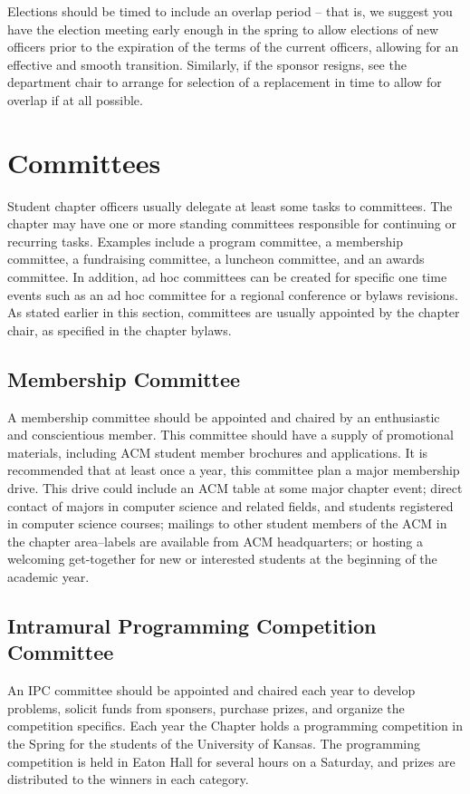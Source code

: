 Elections should be timed to include an overlap period -- that is, we suggest you have the election meeting early enough in the spring to allow elections of new officers prior to the expiration of the terms of the current officers, allowing for an effective and smooth transition. Similarly, if the sponsor resigns, see the department chair to arrange for selection of a replacement in time to allow for overlap if at all possible.

\section{Committees}

Student chapter officers usually delegate at least some tasks to committees. The chapter may have one or more standing committees responsible for continuing or recurring tasks. Examples include a program committee, a membership committee, a fundraising committee, a luncheon committee, and an awards committee. In addition, ad hoc committees can be created for specific one time events such as an ad hoc committee for a regional conference or bylaws revisions. As stated earlier in this section, committees are usually appointed by the chapter chair, as specified in the chapter bylaws.

\subsection*{Membership Committee}
A membership committee should be appointed and chaired by an enthusiastic and conscientious member. This committee should have a supply of promotional materials, including ACM student member brochures and applications. It is recommended that at least once a year, this committee plan a major membership drive. This drive could include an ACM table at some major chapter event; direct contact of majors in computer science and related fields, and students registered in computer science courses; mailings to other student members of the ACM in the chapter area--labels are available from ACM headquarters; or hosting a welcoming get-together for new or interested students at the beginning of the academic year.
\subsection*{Intramural Programming Competition Committee}
An IPC committee should be appointed and chaired each year to develop problems, solicit funds from sponsers, purchase prizes, and organize the competition specifics. Each year the Chapter holds a programming competition in the Spring for the students of the University of Kansas. The programming competition is held in Eaton Hall for several hours on a Saturday, and prizes are distributed to the winners in each category.

